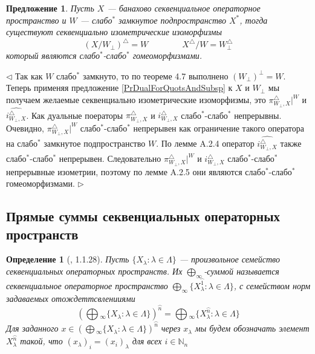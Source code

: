\documentclass[12pt]{article}
\newtheorem{proposition}[theorem]{Предложение}
\newtheorem{definition}[theorem]{Определение}
\newenvironment{proof}{\par $\triangleleft$}{$\triangleright$}
\begin{document}
\begin{proposition}\label{PrDualForWStarClQuotsAndSubsp} Пусть $X$ --- банахово секвенциальное операторное пространство и $W$ --- слабо${}^*$ замкнутое подпространство $X^*$, тогда существуют секвенциально изометрические изоморфизмы
$$
(X/W_\perp)^\triangle= W \qquad\qquad X^\triangle/W=W_\perp^\triangle
$$
который являются слабо${}^*$-слабо${}^*$ гомеоморфизмами.
\end{proposition}
\begin{proof} Так как $W$ слабо${}^*$ замкнуто, то по теореме 4.7 \cite{RudinFA} выполнено  $(W_\perp)^\perp=W$. Теперь применяя предложение \ref{PrDualForQuotsAndSubsp} к $X$ и $W_\perp$ мы получаем желаемые секвенциально изометрические  изоморфизмы, это $\pi_{W_\perp,X}^\triangle|^W$ и $\widehat{i_{W_\perp,X}^\triangle}$. Как дуальные поераторы $\pi_{W_\perp,X}^\triangle$ и $i_{W_\perp,X}^\triangle$ слабо${}^*$-слабо${}^*$ непрерывны. Очевидно, $\pi_{W_\perp,X}^\triangle|^W$ слабо${}^*$-слабо${}^*$ непрерывен как ограничение такого оператора на слабо${}^*$ замкнутое подпространство $W$. По лемме A.2.4 \cite{BleOpAlgAndMods} оператор $\widehat{i_{W_\perp,X}^\triangle}$ также слабо${}^*$-слабо${}^*$ непрерывен. Следовательно  $\pi_{W_\perp,X}^\triangle|^W$ и $\widehat{i_{W_\perp,X}^\triangle}$ слабо${}^*$-слабо${}^*$ непрерывные изометрии, поэтому по лемме A.2.5 \cite{BleOpAlgAndMods} они являются слабо${}^*$-слабо${}^*$ гомеоморфизмами.
\end{proof}






















\subsection{Прямые суммы секвенциальных операторных пространств}

\begin{definition}[\cite{LamOpFolgen}, 1.1.28]\label{DefSQProd}
Пусть $\{X_\lambda: \lambda \in \Lambda\}$ --- произвольное семейство секвенциальных операторных пространств. Их $\bigoplus_\infty$-суммой называется секвенциальное операторное пространство 
$\bigoplus_\infty\{X_\lambda^{\wideparen{1}}:\lambda\in \Lambda\}$, с семейством норм задаваемых отождеттсвленииями 
$$
\left(\bigoplus{}_\infty\{X_\lambda:\lambda \in \Lambda\}\right)^{\wideparen{n}}
=\bigoplus{}_\infty\{X_\lambda^{\wideparen{n}}:\lambda\in \Lambda\}
$$
Для заданного $x\in \left(\bigoplus{}_\infty\{X_\lambda:\lambda \in \Lambda\}\right)^{\wideparen{n}}$ через $x_\lambda$ мы будем обозначать элемент $X_\lambda^{\wideparen{n}}$ такой, что $(x_\lambda)_i=(x_i)_\lambda$ для всех $i\in\mathbb{N}_n$
\end{definition}
\end{document}
